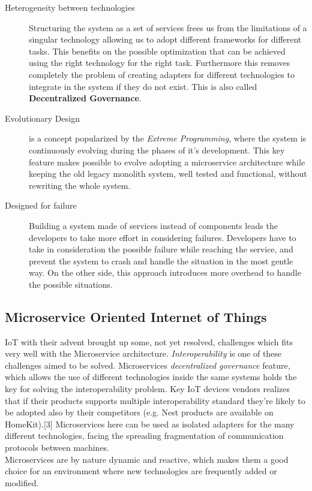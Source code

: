 \begin{description}
  \item[Heterogeneity between technologies] Structuring the system as a set
  of services frees us from the limitations of a singular technology allowing
  us to adopt different frameworks for different tasks. This benefits on the
  possible optimization that can be achieved using the right technology for the
  right task. Furthermore this removes completely the problem of creating adapters
  for different technologies to integrate in the system if they do not exist. This is
  also called \textbf{Decentralized Governance}.
  \item[Evolutionary Design] is a concept popularized by the \textit{Extreme Programming},
  where the system is continuously evolving during the phases of it's development.
  This key feature makes possible to evolve adopting a microservice architecture while
  keeping the old legacy monolith system, well tested and functional, without rewriting
  the whole system.
  \item[Designed for failure] Building a system made of services instead of components
  leads the developers to take more effort in considering failures. Developers have
  to take in consideration the possible failure while reaching the service, and
  prevent the system to crash and handle the situation in the most gentle way. On the
  other side, this approach introduces more overhead to handle the possible situations.


\end{description}


\subsection{Microservice Oriented Internet of Things}
IoT with their advent brought up some, not yet resolved, challenges which fits
very well with the Microservice architecture. \textit{Interoperability} is one of these
challenges aimed to be solved. Microservices \textit{decentralized governance} feature,
which allows the use of different technologies inside the same systems holds the key for
solving the interoperability problem. Key IoT devices vendors realizes that if their products
supports multiple interoperability standard they're likely to be adopted also by their
competitors (e.g. Nest products are available on HomeKit).[3] Microservices here can be
used as isolated adapters for the many different technologies, facing the spreading
fragmentation of communication protocols between machines.\\
Microservices are by nature dynamic and reactive, which makes them a good choice for
an environment where new technologies are frequently added or modified.

